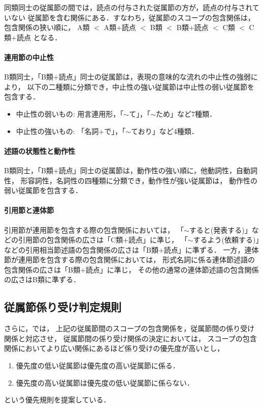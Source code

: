 同類同士の従属節の間では，読点の付与された従属節の方が，読点の付与されていない
従属節を含む関係にある．すなわち，従属節のスコープの包含関係は，
包含関係の狭い順に，
A類 $<$ A類+読点 $<$ B類 $<$ B類+読点 $<$ C類 $<$ C類+読点
となる．


\paragraph{連用節の中止性}

B類同士，「B類+読点」同士の従属節は，表現の意味的な流れの中止性の強弱により，
以下の二種類に分類でき，中止性の強い従属節は中止性の弱い従属節を包含する．
\begin{itemize}
  \item 中止性の弱いもの: 用言連用形，「$\sim$て」，「$\sim$ため」など7種類．
  \item 中止性の強いもの: 「名詞+で」，「$\sim$ており」など4種類．
\end{itemize}

\paragraph{述語の状態性と動作性}

B類同士，「B類+読点」同士の従属節は，動作性の強い順に，他動詞性，自動詞性，
形容詞性，名詞性の四種類に分類でき，動作性が強い従属節は，
動作性の弱い従属節を包含する．

\paragraph{引用節と連体節}

引用節が連用節を包含する際の包含関係においては，
「$\sim$すると(発表する)」などの引用節の包含関係の広さは「C類+読点」に準じ，
「$\sim$するよう(依頼する)」などの引用相当節述語の包含関係の広さは「B類+読点」に準ずる．
一方，連体節が連用節を包含する際の包含関係においては，
形式名詞に係る連体節述語の包含関係の広さは「B類+読点」に準じ，
その他の通常の連体節述語の包含関係の広さはB類に準ずる．

\subsection{従属節係り受け判定規則}
\label{subsec:deprule}

さらに，\cite{SShirai95bj}では，
上記の従属節間のスコープの包含関係を，従属節間の係り受け関係と対応させ，
従属節間の係り受け関係の決定においては，
スコープの包含関係においてより広い関係にあるほど係り受けの優先度が高いとし，
\begin{enumerate}
  \item 優先度の低い従属節は優先度の高い従属節に係る．
  \item 優先度の高い従属節は優先度の低い従属節に係らない．
\end{enumerate}
という優先規則を提案している．

